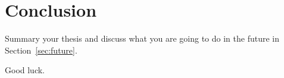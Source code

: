 \chapter{Conclusion}
\label{cha:conc}
Summary your thesis and discuss what you are going to do in the future in Section~\ref{sec:future}.


Good luck.



